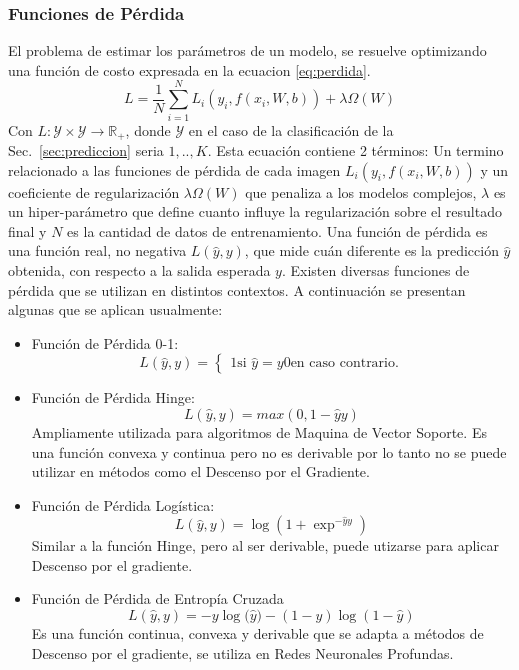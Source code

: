 \documentclass[a4paper,11pt,spanish]{book}
\begin{document}
	\subsubsection{Funciones de Pérdida}
	  El problema de estimar los parámetros de un modelo, se resuelve optimizando una función de costo expresada en la ecuacion \eqref{eq:perdida}.
          \begin{equation}\label{eq:perdida}
	    L = \frac{1}{N}\sum_{i=1}^{N} L_i(y_i, f(x_i, W, b)) + \lambda \Omega(W)
          \end{equation}
          Con $L:\mathcal{Y}\times \mathcal{Y}\rightarrow\mathbb{R}_+$, donde $\mathcal{Y}$ en el caso de la clasificación de la Sec.~\ref{sec:prediccion} seria ${1,..,K}$.
          Esta ecuación contiene 2 términos: Un termino relacionado a las funciones de pérdida de cada imagen $L_i(y_i, f(x_i, W, b))$
          y un coeficiente de regularización $\lambda \Omega(W)$ que penaliza a los modelos complejos, $\lambda$ es un hiper-parámetro que define cuanto influye la regularización
          sobre el resultado final y $N$ es la cantidad de datos de entrenamiento.
	  Una función de pérdida es una función real, no negativa $L({\widehat y}, y)$, que mide cuán diferente es la predicción ${\widehat y}$ obtenida, con respecto a la
	  salida esperada $y$. Existen diversas funciones de pérdida que se utilizan en distintos contextos. A continuación se presentan algunas que se aplican usualmente:
	  \begin{itemize}
	    \item Función de Pérdida 0-1:
	      \begin{equation*}
		L({\widehat y}, y) =  \begin{cases}
					    1 \text{si ${\widehat y} = y$}
					    0 \text{en caso contrario.}
		                      \end{cases}
	      \end{equation*}
	    \item Función de Pérdida Hinge:
	      \begin{equation*}
		L({\widehat y}, y) =  max(0, 1 - {\widehat y}y)
	      \end{equation*}
	      Ampliamente utilizada para algoritmos de Maquina de Vector Soporte.
	      Es una función convexa y continua pero no es derivable por lo tanto no se puede utilizar en métodos como el Descenso por el Gradiente.
	    \item Función de Pérdida Logística:
	      \begin{equation*}
		L({\widehat y}, y) =  {\log(1+ {\exp^{-{\widehat y}y}})}
	      \end{equation*}
	      Similar a la función Hinge, pero al ser derivable, puede utizarse para aplicar Descenso por el gradiente.
	    \item Función de Pérdida de Entropía Cruzada
	      \begin{equation*}
		L({\widehat y}, y) = -y{\log({\widehat y}}) - (1-y) {\log(1-{\widehat y})}
	      \end{equation*}
	      Es una función continua, convexa y derivable que se adapta a métodos de Descenso por el gradiente, se utiliza en Redes Neuronales Profundas.

	  \end{itemize}
\end{document}
